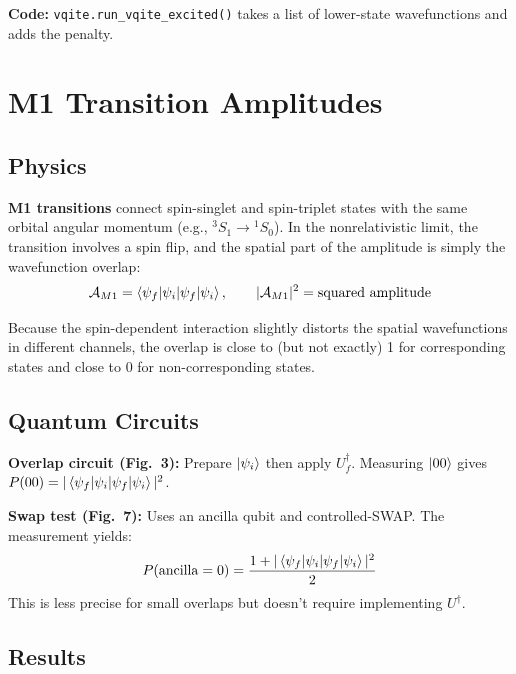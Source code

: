 \documentclass[11pt,a4paper]{article}
\begin{document}
\vspace{0.3em}
\noindent\textbf{Code:} \texttt{vqite.run\_vqite\_excited()} takes a list of lower-state wavefunctions and adds the penalty.


\section{M1 Transition Amplitudes}

\subsection{Physics}

\textbf{M1 transitions} connect spin-singlet and spin-triplet states with the same orbital angular momentum (e.g., ${}^3S_1 \to {}^1S_0$). In the nonrelativistic limit, the transition involves a spin flip, and the spatial part of the amplitude is simply the wavefunction overlap:
\begin{equation}
  \mathcal{A}_{M1} = \braket{\psi_f | \psi_i}, \qquad |\mathcal{A}_{M1}|^2 = \text{squared amplitude}
\end{equation}

Because the spin-dependent interaction slightly distorts the spatial wavefunctions in different channels, the overlap is close to (but not exactly) 1 for corresponding states and close to 0 for non-corresponding states.

\subsection{Quantum Circuits}

\textbf{Overlap circuit (Fig.~3):} Prepare $\ket{\psi_i}$ then apply $U_f^\dagger$. Measuring $\ket{00}$ gives $P(00) = |\braket{\psi_f|\psi_i}|^2$.

\textbf{Swap test (Fig.~7):} Uses an ancilla qubit and controlled-SWAP. The measurement yields:
\begin{equation}
  P(\text{ancilla} = 0) = \frac{1 + |\braket{\psi_f|\psi_i}|^2}{2}
\end{equation}
This is less precise for small overlaps but doesn't require implementing $U^\dagger$.

\subsection{Results}
\end{document}
